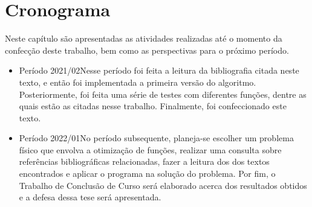 \chapter{Cronograma}\label{cap_cronograma}

Neste capítulo são apresentadas as atividades realizadas até o momento da confecção deste
trabalho, bem como as perspectivas para o próximo período.

\begin{itemize}
  \item Período 2021/02\trav Nesse período foi feita a leitura da bibliografia citada neste
        texto, e então foi implementada a primeira versão do algoritmo. 
        Posteriormente, foi feita uma série de testes com diferentes funções, dentre as quais
        estão as citadas nesse trabalho. Finalmente, foi confeccionado este texto.
  \item Período 2022/01\trav No período subsequente, planeja-se escolher um problema físico
        que envolva a otimização de funções, realizar uma consulta sobre referências bibliográficas
        relacionadas, fazer a leitura dos dos textos encontrados e aplicar o programa na solução
        do problema. Por fim, o Trabalho de Conclusão de Curso será elaborado acerca dos
        resultados obtidos e a defesa dessa tese será apresentada.
\end{itemize}
